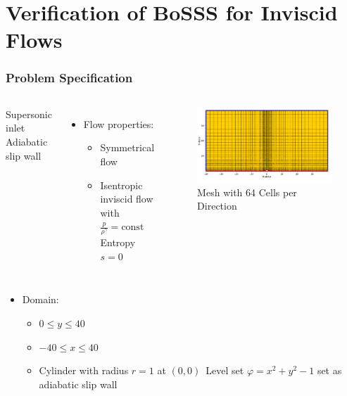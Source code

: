\section{Verification of BoSSS for Inviscid Flows}
\frame{\tableofcontents[currentsection]}
\begin{frame}
	\frametitle{Problem Specification}
	
			\begin{columns}[t]
				\column[]{4cm}
				\vspace{-0.5cm}
				\begin{itemize}
					\bluedot Supersonic inlet
					\reddot Adiabatic slip wall
				\end{itemize}
				\begin{itemize}
					\item Flow properties:
					\begin{itemize}
						\item Symmetrical flow
					 	\item Isentropic inviscid flow with $\tfrac{p}{\rho^\gamma}=\text{const}$ \newline \MVRightarrow \, Entropy $s = 0$				
					\end{itemize}
				\end{itemize}
				\column[]{8cm}
				\begin{figure}[htbp]
					\vspace{-1cm}
					\includegraphics[width=\textwidth]{img/inviscid2.PNG}
					\vspace{-0.3cm}
					\caption{Mesh with 64 Cells per Direction}
				\end{figure} 
			\end{columns}
				\vspace{-0.8cm}
				\begin{itemize}
						\item Domain:
					\begin{itemize}
						\item $0 \leq y \leq 40$
						\item $-40 \leq x \leq 40$
						\item Cylinder with radius $r=1$ at $(0,0)$\newline \MVRightarrow \, Level set $\varphi  = x^2 + y^2 -1$ set as \color{myred} adiabatic slip wall\color{black}			
					\end{itemize}
				\end{itemize}

\end{frame}
